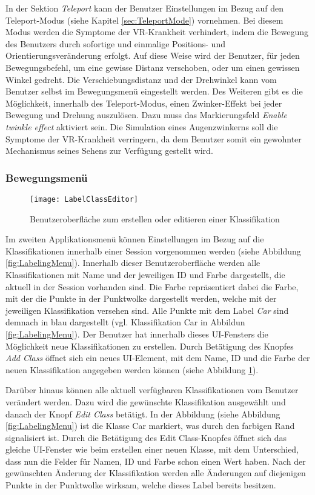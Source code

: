 In der Sektion \textit{Teleport} kann der Benutzer Einstellungen im Bezug auf den Teleport-Modus (siehe Kapitel \ref{sec:TeleportMode}) vornehmen. Bei diesem Modus werden die Symptome der VR-Krankheit verhindert, indem die Bewegung des Benutzers durch sofortige und einmalige Positions- und Orientierungsveränderung erfolgt. Auf diese Weise wird der Benutzer, für jeden Bewegungsbefehl, um eine gewisse Distanz verschoben, oder um einen gewissen Winkel gedreht. Die Verschiebungsdistanz und der Drehwinkel kann vom Benutzer selbst im Bewegungsmenü eingestellt werden. Des Weiteren gibt es die Möglichkeit, innerhalb des Teleport-Modus, einen Zwinker-Effekt bei jeder Bewegung und Drehung auszulösen. Dazu muss das Markierungsfeld \textit{Enable twinkle effect} aktiviert sein. Die Simulation eines Augenzwinkerns soll die Symptome der VR-Krankheit verringern, da dem Benutzer somit ein gewohnter Mechanismus seines Sehens zur Verfügung gestellt wird.\\


\subsubsection{Bewegungsmenü}

\begin{figure}%
	\centering
    \texttt{[image: LabelClassEditor]}
    \caption{Benutzeroberfläche zum erstellen oder editieren einer Klassifikation}
    \label{fig:LabelClassEditor}
\end{figure}
Im zweiten Applikationsmenü können Einstellungen im Bezug auf die Klassifikationen innerhalb einer Session vorgenommen werden (siehe Abbildung \ref{fig:LabelingMenu}). Innerhalb dieser Benutzeroberfläche werden alle Klassifikationen mit Name und der jeweiligen ID und Farbe dargestellt, die aktuell in der Session vorhanden sind. Die Farbe repräsentiert dabei die Farbe, mit der die Punkte in der Punktwolke dargestellt werden, welche mit der jeweiligen Klassifikation versehen sind. Alle Punkte mit dem Label \textit{Car} sind demnach in blau dargestellt (vgl. Klassifikation Car in Abbildun \ref{fig:LabelingMenu}). Der Benutzer hat innerhalb dieses UI-Fensters die Möglichkeit neue Klassifikationen zu erstellen. Durch Betätigung des Knopfes \textit{Add Class} öffnet sich ein neues UI-Element, mit dem Name, ID und die Farbe der neuen Klassifikation angegeben werden können (siehe Abbildung \ref{fig:LabelClassEditor}). 

Darüber hinaus können alle aktuell verfügbaren Klassifikationen vom Benutzer verändert werden. Dazu wird die gewünschte Klassifikation ausgewählt und danach der Knopf \textit{Edit Class} betätigt. In der Abbildung (siehe Abbildung \ref{fig:LabelingMenu}) ist die Klasse Car markiert, was durch den farbigen Rand signalisiert ist. Durch die Betätigung des Edit Class-Knopfes öffnet sich das gleiche UI-Fenster wie beim erstellen einer neuen Klasse, mit dem Unterschied, dass nun die Felder für Namen, ID und Farbe schon einen Wert haben. Nach der gewünschten Änderung der Klassifikation werden alle Änderungen auf diejenigen Punkte in der Punktwolke wirksam, welche dieses Label bereits besitzen. 

